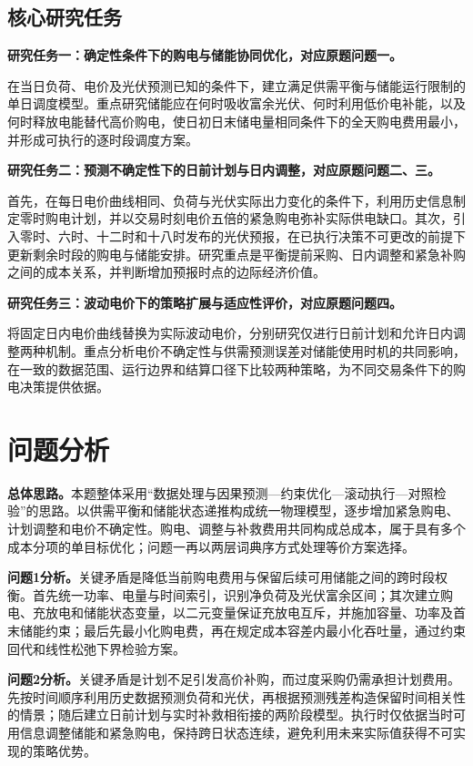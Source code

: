 \documentclass[UTF8,a4paper,12pt,fontset=fandol]{ctexart}
\numberwithin{equation}{section}
\begin{document}
\subsection{核心研究任务}

\textbf{研究任务一：确定性条件下的购电与储能协同优化，对应原题问题一。}

在当日负荷、电价及光伏预测已知的条件下，建立满足供需平衡与储能运行限制的单日调度模型。重点研究储能应在何时吸收富余光伏、何时利用低价电补能，以及何时释放电能替代高价购电，使日初日末储电量相同条件下的全天购电费用最小，并形成可执行的逐时段调度方案。

\textbf{研究任务二：预测不确定性下的日前计划与日内调整，对应原题问题二、三。}

首先，在每日电价曲线相同、负荷与光伏实际出力变化的条件下，利用历史信息制定零时购电计划，并以交易时刻电价五倍的紧急购电弥补实际供电缺口。其次，引入零时、六时、十二时和十八时发布的光伏预报，在已执行决策不可更改的前提下更新剩余时段的购电与储能安排。研究重点是平衡提前采购、日内调整和紧急补购之间的成本关系，并判断增加预报时点的边际经济价值。

\textbf{研究任务三：波动电价下的策略扩展与适应性评价，对应原题问题四。}

将固定日内电价曲线替换为实际波动电价，分别研究仅进行日前计划和允许日内调整两种机制。重点分析电价不确定性与供需预测误差对储能使用时机的共同影响，在一致的数据范围、运行边界和结算口径下比较两种策略，为不同交易条件下的购电决策提供依据。

\clearpage
\section{问题分析}
\label{sec:analysis}
\begingroup
\small
{}

\textbf{总体思路。}本题整体采用“数据处理与因果预测---约束优化---滚动执行---对照检验”的思路。以供需平衡和储能状态递推构成统一物理模型，逐步增加紧急购电、计划调整和电价不确定性。购电、调整与补救费用共同构成总成本，属于具有多个成本分项的单目标优化；问题一再以两层词典序方式处理等价方案选择。

\textbf{问题1分析。}关键矛盾是降低当前购电费用与保留后续可用储能之间的跨时段权衡。首先统一功率、电量与时间索引，识别净负荷及光伏富余区间；其次建立购电、充放电和储能状态变量，以二元变量保证充放电互斥，并施加容量、功率及首末储能约束；最后先最小化购电费，再在规定成本容差内最小化吞吐量，通过约束回代和线性松弛下界检验方案。

\textbf{问题2分析。}关键矛盾是计划不足引发高价补购，而过度采购仍需承担计划费用。先按时间顺序利用历史数据预测负荷和光伏，再根据预测残差构造保留时间相关性的情景；随后建立日前计划与实时补救相衔接的两阶段模型。执行时仅依据当时可用信息调整储能和紧急购电，保持跨日状态连续，避免利用未来实际值获得不可实现的策略优势。
\end{document}
